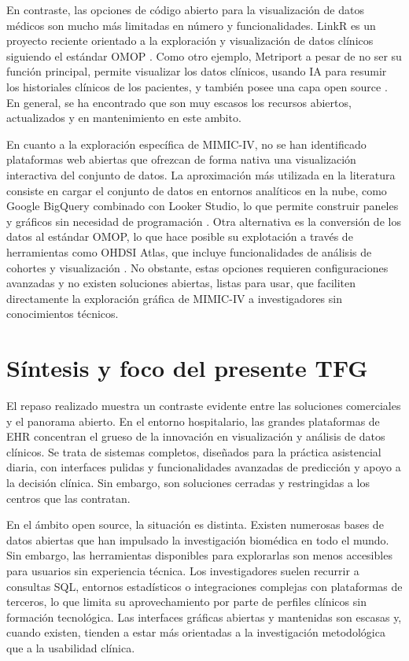 En contraste, las opciones de código abierto para la visualización de datos médicos son mucho más limitadas en número y funcionalidades. LinkR es un proyecto reciente orientado a la exploración y visualización de datos clínicos siguiendo el estándar OMOP \cite{linkR}. Como otro ejemplo, Metriport a pesar de no ser su función principal, permite visualizar los datos clínicos, usando IA para resumir los historiales clínicos de los pacientes, y también posee una capa open source \cite{metriport}. En general, se ha encontrado que son muy escasos los recursos abiertos, actualizados y en mantenimiento en este ambito.


En cuanto a la exploración específica de MIMIC-IV, no se han identificado plataformas web abiertas que ofrezcan de forma nativa una visualización interactiva del conjunto de datos. La aproximación más utilizada en la literatura consiste en cargar el conjunto de datos en entornos analíticos en la nube, como Google BigQuery combinado con Looker Studio, lo que permite construir paneles y gráficos sin necesidad de programación \cite{bigquery_mimic}. Otra alternativa es la conversión de los datos al estándar OMOP, lo que hace posible su explotación a través de herramientas como OHDSI Atlas, que incluye funcionalidades de análisis de cohortes y visualización \cite{OHDSI_Atlas, MIMICIV_OMOP_Demo}. No obstante, estas opciones requieren configuraciones avanzadas y no existen soluciones abiertas, listas para usar, que faciliten directamente la exploración gráfica de MIMIC-IV a investigadores sin conocimientos técnicos.



\section{Síntesis y foco del presente TFG}

El repaso realizado muestra un contraste evidente entre las soluciones comerciales y el panorama abierto. En el entorno hospitalario, las grandes plataformas de EHR concentran el grueso de la innovación en visualización y análisis de datos clínicos. Se trata de sistemas completos, diseñados para la práctica asistencial diaria, con interfaces pulidas y funcionalidades avanzadas de predicción y apoyo a la decisión clínica. Sin embargo, son soluciones cerradas y restringidas a los centros que las contratan.

En el ámbito open source, la situación es distinta. Existen numerosas bases de datos abiertas que han impulsado la investigación biomédica en todo el mundo. Sin embargo, las herramientas disponibles para explorarlas son menos accesibles para usuarios sin experiencia técnica. Los investigadores suelen recurrir a consultas SQL, entornos estadísticos o integraciones complejas con plataformas de terceros, lo que limita su aprovechamiento por parte de perfiles clínicos sin formación tecnológica. Las interfaces gráficas abiertas y mantenidas son escasas y, cuando existen, tienden a estar más orientadas a la investigación metodológica que a la usabilidad clínica.

